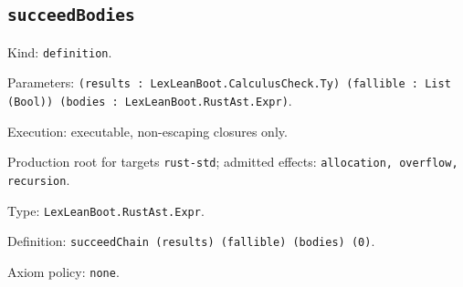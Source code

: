\documentclass[11pt]{article}
\begin{document}
\subsection*{\texttt{succeedBodies}}
\noindent Kind: \texttt{definition}.\par
\noindent Parameters: \texttt{(results : LexLeanBoot.CalculusCheck.Ty) (fallible : List (Bool)) (bodies : LexLeanBoot.RustAst.Expr)}.\par
\noindent Execution: executable, non-escaping closures only.\par
\noindent Production root for targets \texttt{rust-std}; admitted effects: \texttt{allocation, overflow, recursion}.\par
\noindent Type: \texttt{LexLeanBoot.RustAst.Expr}.\par
\noindent Definition: \texttt{succeedChain (results) (fallible) (bodies) (0)}.\par
\noindent Axiom policy: \texttt{none}.\par
\end{document}
